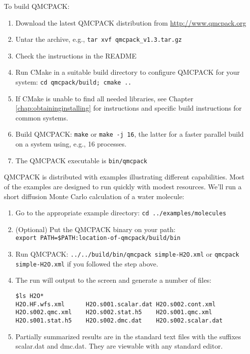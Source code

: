 To build QMCPACK:

\begin{enumerate}
\item Download the latest QMCPACK distribution from
  \url{http://www.qmcpack.org}
\item Untar the archive, e.g., \texttt{tar xvf
    qmcpack\_v1.3.tar.gz}
\item Check the instructions in the README
\item Run CMake in a suitable build directory to configure QMCPACK for
  your system: \texttt{cd
    qmcpack/build; cmake ..}
\item If CMake is unable to find all needed libraries, see Chapter
  \ref{chap:obtaininginstalling} for instructions and specific build
  instructions for common systems.
\item Build QMCPACK: \texttt{make} or \texttt{make -j 16}, the latter
  for a faster parallel build on a system using, e.g., 16 processes.
\item The QMCPACK executable is \texttt{bin/qmcpack}
\end{enumerate}

QMCPACK is distributed with examples illustrating different
capabilities. Most of the examples are designed to run quickly with
modest resources. We'll run a short diffusion Monte Carlo calculation
of a water molecule:

\begin{enumerate}
\item Go to the appropriate example directory: \texttt{cd
    ../examples/molecules}
\item (Optional) Put the QMCPACK binary on your path:\\ \texttt{export PATH=\$PATH:location-of-qmcpack/build/bin}
\item Run QMCPACK: \texttt{../../build/bin/qmcpack simple-H2O.xml} or
  \texttt{qmcpack simple-H2O.xml} if you followed the step above.
\item The run will output to the screen and generate a number of files:
\begin{verbatim}
$ls H2O*
H2O.HF.wfs.xml      H2O.s001.scalar.dat H2O.s002.cont.xml
H2O.s002.qmc.xml    H2O.s002.stat.h5    H2O.s001.qmc.xml
H2O.s001.stat.h5    H2O.s002.dmc.dat    H2O.s002.scalar.dat
\end{verbatim}
\item Partially summarized results are in the standard text files with the
  suffixes scalar.dat and dmc.dat. They are viewable with any standard editor.
\end{enumerate}


